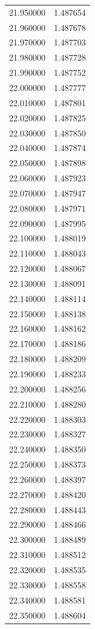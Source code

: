 \begin{tabular}{rr}
21.950000 & 1.487654 \\
21.960000 & 1.487678 \\
21.970000 & 1.487703 \\
21.980000 & 1.487728 \\
21.990000 & 1.487752 \\
22.000000 & 1.487777 \\
22.010000 & 1.487801 \\
22.020000 & 1.487825 \\
22.030000 & 1.487850 \\
22.040000 & 1.487874 \\
22.050000 & 1.487898 \\
22.060000 & 1.487923 \\
22.070000 & 1.487947 \\
22.080000 & 1.487971 \\
22.090000 & 1.487995 \\
22.100000 & 1.488019 \\
22.110000 & 1.488043 \\
22.120000 & 1.488067 \\
22.130000 & 1.488091 \\
22.140000 & 1.488114 \\
22.150000 & 1.488138 \\
22.160000 & 1.488162 \\
22.170000 & 1.488186 \\
22.180000 & 1.488209 \\
22.190000 & 1.488233 \\
22.200000 & 1.488256 \\
22.210000 & 1.488280 \\
22.220000 & 1.488303 \\
22.230000 & 1.488327 \\
22.240000 & 1.488350 \\
22.250000 & 1.488373 \\
22.260000 & 1.488397 \\
22.270000 & 1.488420 \\
22.280000 & 1.488443 \\
22.290000 & 1.488466 \\
22.300000 & 1.488489 \\
22.310000 & 1.488512 \\
22.320000 & 1.488535 \\
22.330000 & 1.488558 \\
22.340000 & 1.488581 \\
22.350000 & 1.488604 \\

\end{tabular}
